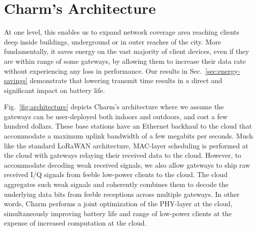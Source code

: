 \section{Charm's Architecture}
\label{sec:arch}



 At one
level, this  enables us to expand network coverage area reaching clients deep
inside buildings, underground or in outer reaches of the city. More
fundamentally, it saves energy on the vast majority of client devices, even if
they are within range of some gateways, by allowing them to increase their
data rate without experiencing any loss in performance. Our results in
Sec.~\ref{sec:energy-savings} demonstrate that lowering transmit time results
in a direct and significant impact on battery life.

Fig.~\ref{fig:architecture} depicts Charm's architecture where we assume the
gateways can be user-deployed  both indoors and outdoors, and cost a few
hundred dollars. These base stations have an Ethernet backhaul to the cloud
that accommodate a maximum uplink bandwidth of a few megabits per seconds.
Much like the standard LoRaWAN architecture, MAC-layer scheduling is performed
at the cloud with gateways relaying their received data to the cloud. However,
to accommodate decoding weak received signals, we also allow gateways to ship
raw received I/Q signals from feeble low-power clients to the cloud. The cloud
aggregates such weak signals and coherently combines them to decode the
underlying data bits from feeble receptions across multiple gateways. In other
words, Charm performs a joint optimization of the  PHY-layer at the cloud,
simultaneously improving battery life and range of low-power clients at the
expense of increased computation at the cloud.

